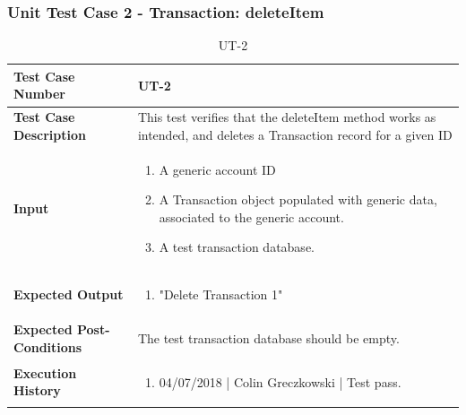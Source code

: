 \documentclass[12pt]{article}
\begin{document}
\subsubsection{Unit Test Case 2 - Transaction: deleteItem}
\def\arraystretch{1.5}%
\begin{table}[htbp]
\centering
\caption {UT-2}
\label{UT-2}
\begin{tabularx}{\textwidth}{ | l | X |}
\hline
\textbf{Test Case Number}      &  UT-2                         \\ \hline
\textbf{Test Case Description}    &  This test verifies that the deleteItem method works as intended, and deletes a Transaction record for a given ID                \\ \hline
\textbf{Input}         & 	\begin{enumerate}
          \item A generic account ID
	\item A Transaction object populated with generic data, associated to the generic account.
	\item A test transaction database.
\end{enumerate} \\ \hline

\textbf{Expected Output}     & \begin{enumerate}
	\item "Delete Transaction 1"
\end{enumerate} \\ \hline
\textbf{Expected Post-Conditions}           & The test transaction database should be empty.                \\ \hline
\textbf{Execution History}   &  \begin{enumerate}
	\item 04/07/2018 | Colin Greczkowski | Test pass.
\end {enumerate} \\ \hline
\end{tabularx}
\end{table}
\clearpage

\end{document}
